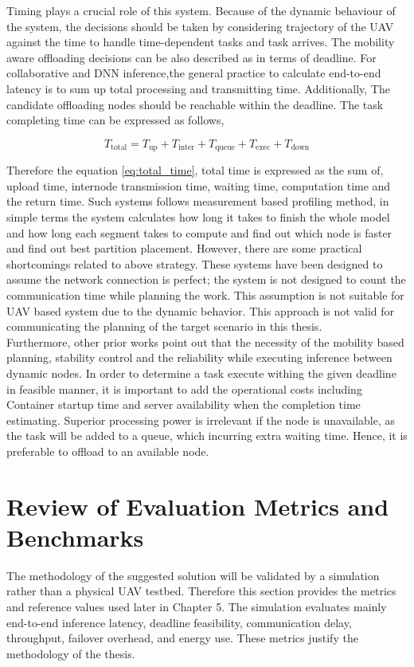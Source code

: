 Timing plays a crucial role of this system. Because of the dynamic behaviour of the system, the decisions should be taken by considering trajectory of the UAV against the time to handle time-dependent tasks and task arrives. The mobility aware offloading decisions can be also described as in terms of deadline.
For collaborative and DNN inference,the general practice to calculate end-to-end latency is to sum up total processing and transmitting time. Additionally, The candidate offloading nodes should be reachable within the deadline. The task completing time can be expressed as follows,

\begin{equation}
	T_{\text{total}} = T_{\text{up}} + T_{\text{inter}} + T_{\text{queue}} + T_{\text{exec}} + T_{\text{down}}
	\label{eq:total_time}
\end{equation}


Therefore the equation \ref{eq:total_time}, total time is expressed as the sum of, upload time, internode transmission time, waiting time, computation time and the return time\cite{Chen2024Mobility}\cite{Mu2024FineGrain}. Such systems follows measurement based profiling method, in simple terms the system calculates how long it takes to finish the whole model and how long each segment takes to compute and find out which node is faster and find out best partition placement. However, there are some practical shortcomings related to above strategy. These systems have been designed to assume the network connection is perfect;  the system is not designed to count the communication time while planning the work. This assumption is not suitable for UAV based system due to the dynamic behavior\cite{Seo2025DNNPipe}. This approach is not valid for communicating the planning of the target scenario in this thesis.\\

Furthermore, other prior works point out that the necessity of the mobility based planning, stability control and the reliability while executing inference between dynamic nodes. In order to determine a task execute withing the given deadline in feasible manner, it is important to add the operational costs including Container startup time and server availability when the completion time estimating\cite{Chen2024Mobility}. Superior processing power is irrelevant if the node is unavailable, as the task will be added to a queue, which incurring extra waiting time. Hence, it is preferable to offload to an available node.


\section{Review of Evaluation Metrics and Benchmarks}
\label{evo_bench}
The methodology of the suggested solution will be validated by a simulation rather than a physical UAV testbed. Therefore this section provides the metrics and reference values used later in Chapter 5. The simulation evaluates mainly end-to-end inference latency, deadline feasibility, communication delay, throughput, failover overhead, and energy use. These metrics justify the methodology of the thesis. \\

